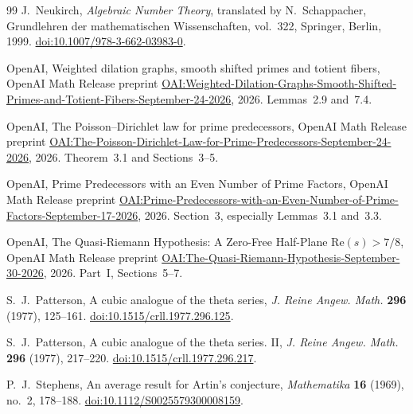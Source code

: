 \begin{thebibliography}{99}
J.~Neukirch,
\emph{Algebraic Number Theory},
translated by N.~Schappacher,
Grundlehren der mathematischen Wissenschaften, vol.~322,
Springer, Berlin, 1999.
\href{https://doi.org/10.1007/978-3-662-03983-0}{doi:10.1007/978-3-662-03983-0}.

OpenAI,
Weighted dilation graphs, smooth shifted primes and totient fibers,
OpenAI Math Release preprint
\href{https://github.com/openai/math/blob/main/preprints/Weighted-Dilation-Graphs-Smooth-Shifted-Primes-and-Totient-Fibers-September-24-2026/paper.pdf}{OAI:Weighted-Dilation-Graphs-Smooth-Shifted-Primes-and-Totient-Fibers-September-24-2026},
2026. Lemmas~2.9 and~7.4.

OpenAI,
The Poisson--Dirichlet law for prime predecessors,
OpenAI Math Release preprint
\href{https://github.com/openai/math/blob/main/preprints/The-Poisson-Dirichlet-Law-for-Prime-Predecessors-September-24-2026/paper.pdf}{OAI:The-Poisson-Dirichlet-Law-for-Prime-Predecessors-September-24-2026},
2026. Theorem~3.1 and Sections~3--5.

OpenAI,
Prime Predecessors with an Even Number of Prime Factors,
OpenAI Math Release preprint
\href{https://github.com/openai/math/blob/main/preprints/Prime-Predecessors-with-an-Even-Number-of-Prime-Factors-September-17-2026/paper.pdf}{OAI:Prime-Predecessors-with-an-Even-Number-of-Prime-Factors-September-17-2026},
2026. Section~3, especially Lemmas~3.1 and~3.3.

OpenAI,
The Quasi-Riemann Hypothesis: A Zero-Free Half-Plane
$\mathrm{Re}(s)>7/8$,
OpenAI Math Release preprint
\href{https://github.com/openai/math/blob/main/preprints/The-Quasi-Riemann-Hypothesis-September-30-2026/paper.pdf}{OAI:The-Quasi-Riemann-Hypothesis-September-30-2026},
2026. Part~I, Sections~5--7.

S.~J.~Patterson,
A cubic analogue of the theta series,
\emph{J. Reine Angew. Math.} \textbf{296} (1977), 125--161.
\href{https://doi.org/10.1515/crll.1977.296.125}{doi:10.1515/crll.1977.296.125}.

S.~J.~Patterson,
A cubic analogue of the theta series. II,
\emph{J. Reine Angew. Math.} \textbf{296} (1977), 217--220.
\href{https://doi.org/10.1515/crll.1977.296.217}{doi:10.1515/crll.1977.296.217}.

P.~J.~Stephens,
An average result for Artin's conjecture,
\emph{Mathematika} \textbf{16} (1969), no.~2, 178--188.
\href{https://doi.org/10.1112/S0025579300008159}{doi:10.1112/S0025579300008159}.


\end{thebibliography}
